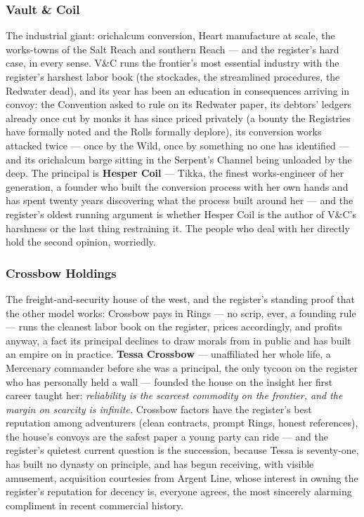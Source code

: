 \subsubsection{Vault \& Coil}

The industrial giant: orichalcum conversion, Heart manufacture at scale, the works-towns of the Salt Reach and southern Reach --- and the register's hard case, in every sense. V\&C runs the frontier's most essential industry with the register's harshest labor book (the stockades, the streamlined procedures, the Redwater dead), and its year has been an education in consequences arriving in convoy: the Convention asked to rule on its Redwater paper, its debtors' ledgers already once cut by monks it has since priced privately (a bounty the Registries have formally noted and the Rolls formally deplore), its conversion works attacked twice --- once by the Wild, once by something no one has identified --- and its orichalcum barge sitting in the Serpent's Channel being unloaded by the deep. The principal is \textbf{Hesper Coil} --- Tikka, the finest works-engineer of her generation, a founder who built the conversion process with her own hands and has spent twenty years discovering what the process built around her --- and the register's oldest running argument is whether Hesper Coil is the author of V\&C's harshness or the last thing restraining it. The people who deal with her directly hold the second opinion, worriedly.

\subsubsection{Crossbow Holdings}

The freight-and-security house of the west, and the register's standing proof that the other model works: Crossbow pays in Rings --- no scrip, ever, a founding rule --- runs the cleanest labor book on the register, prices accordingly, and profits anyway, a fact its principal declines to draw morals from in public and has built an empire on in practice. \textbf{Tessa Crossbow} --- unaffiliated her whole life, a Mercenary commander before she was a principal, the only tycoon on the register who has personally held a wall --- founded the house on the insight her first career taught her: \textit{reliability is the scarcest commodity on the frontier, and the margin on scarcity is infinite.} Crossbow factors have the register's best reputation among adventurers (clean contracts, prompt Rings, honest references), the house's convoys are the safest paper a young party can ride --- and the register's quietest current question is the succession, because Tessa is seventy-one, has built no dynasty on principle, and has begun receiving, with visible amusement, acquisition courtesies from Argent Line, whose interest in owning the register's reputation for decency is, everyone agrees, the most sincerely alarming compliment in recent commercial history.

